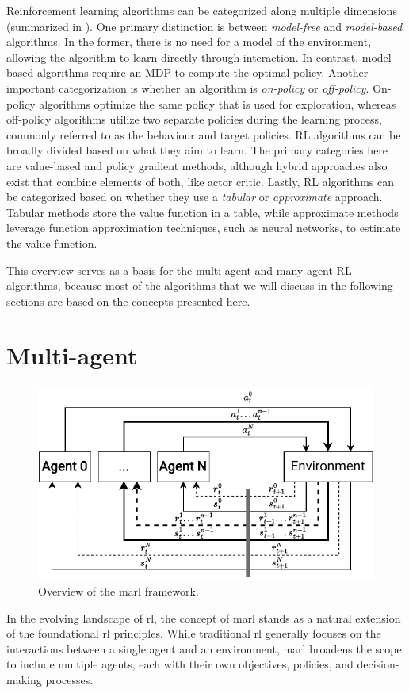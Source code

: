 Reinforcement learning algorithms can be categorized along multiple dimensions (summarized in ). 
 One primary distinction is between \emph{model-free} and \emph{model-based} algorithms. 
 In the former, there is no need for a model of the environment, allowing the algorithm to learn directly through interaction. 
 In contrast, model-based algorithms require an MDP to compute the optimal policy.
%
Another important categorization is whether an algorithm is \emph{on-policy} or \emph{off-policy}. 
 On-policy algorithms optimize the same policy that is used for exploration, 
 whereas off-policy algorithms utilize two separate policies during the learning process, commonly referred to as the behaviour and target policies.
%
RL algorithms can be broadly divided based on what they aim to learn. 
 The primary categories here are value-based and policy gradient methods, 
 although hybrid approaches also exist that combine elements of both, like actor critic.
%
Lastly, RL algorithms can be categorized based on whether they use a \emph{tabular} or \emph{approximate} approach. 
 Tabular methods store the value function in a table, 
 while approximate methods leverage function approximation techniques, 
 such as neural networks, to estimate the value function.

This overview serves as a basis for the multi-agent and many-agent RL algorithms,
 because most of the algorithms that we will discuss in the following sections are based on the concepts presented here.

\section{Multi-agent}
\begin{figure}
\includegraphics[width=\textwidth]{chapters/img/multi-agent-rl.drawio.pdf}
\caption{Overview of the \ac{marl} framework.}\label{fig:marl:overview}
\end{figure}
In the evolving landscape of \ac{rl}, the concept of \ac{marl} stands as a natural extension of the foundational \ac{rl} principles. 
 While traditional \ac{rl} generally focuses on the interactions between a single agent and an environment, 
 \ac{marl} broadens the scope to include multiple agents, 
 each with their own objectives, policies, and decision-making processes.

